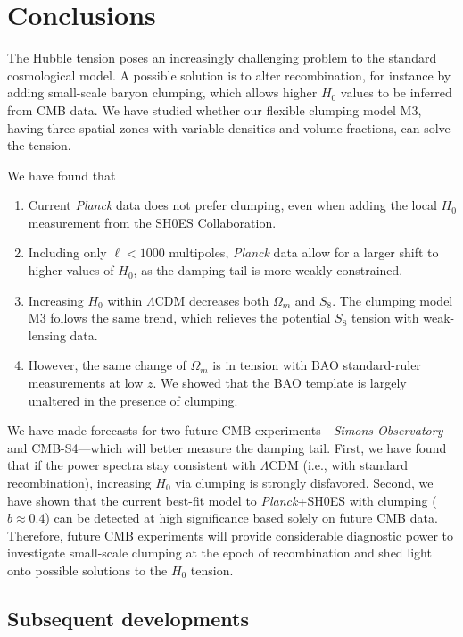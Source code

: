 \section{Conclusions}
\label{sec:conclusion}

The Hubble tension poses an increasingly challenging problem to the standard cosmological model.
A possible solution is to alter recombination, for instance by adding
small-scale baryon clumping, which allows higher $H_0$ values to be inferred from CMB data.
We have studied whether our flexible clumping model M3, having three spatial zones with variable densities and volume fractions, can solve the tension.

We have found that
\renewcommand{\theenumi}{(\roman{enumi})}
\renewcommand{\labelenumi}{\theenumi}
\begin{enumerate}
\item Current {\it Planck} data does not prefer clumping, even when adding the local $H_0$ measurement from the SH0ES Collaboration.
\item Including only $\ell<1000$ multipoles, {\it Planck} data allow for a larger shift to higher values of $H_0$, as the damping tail is more weakly constrained.
\item Increasing $H_0$ within $\Lambda$CDM decreases both $\Omega_m$ and $S_8$. The clumping model M3 follows the same trend, which relieves the potential $S_8$ tension with weak-lensing data.
\item However, the same change of $\Omega_m$ is in tension with BAO standard-ruler measurements at low $z$. 
We showed that the BAO template is largely unaltered in the presence of clumping.
\end{enumerate}

We have made forecasts for two future CMB experiments---{\it Simons Observatory} and CMB-S4---which will better measure the damping tail.
First, we have found that if the power spectra stay consistent with $\Lambda$CDM (i.e., with standard recombination), increasing $H_0$ via clumping is strongly disfavored.
Second, we have shown that the current best-fit model to {\it Planck}+SH0ES with clumping ($b\approx 0.4$) can be detected at high significance based solely on future CMB data.
Therefore, future CMB experiments will provide considerable diagnostic power to investigate small-scale clumping at the epoch of recombination and shed light onto possible solutions to the $H_0$ tension.

\subsection{Subsequent developments}
\label{sec:clumping-subsequent}

